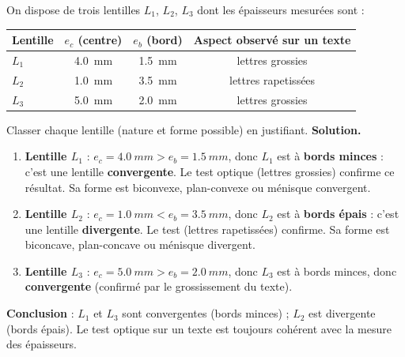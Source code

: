 \documentclass[11pt]{article}
\begin{document}
\begin{exoresolu}
On dispose de trois lentilles $L_1$, $L_2$, $L_3$ dont les épaisseurs mesurées sont :
\begin{center}
\begin{tabular}{|l|c|c|c|}
\hline
\rowcolor{popblueL} Lentille & $e_c$ (centre) & $e_b$ (bord) & Aspect observé sur un texte \\
\hline
$L_1$ & \SI{4,0}{mm} & \SI{1,5}{mm} & lettres grossies \\
\hline
$L_2$ & \SI{1,0}{mm} & \SI{3,5}{mm} & lettres rapetissées \\
\hline
$L_3$ & \SI{5,0}{mm} & \SI{2,0}{mm} & lettres grossies \\
\hline
\end{tabular}
\end{center}
Classer chaque lentille (nature et forme possible) en justifiant.
\tcblower
\textbf{Solution.}
\begin{enumerate}
\item \textbf{Lentille $L_1$} : $e_c = \SI{4,0}{mm} > e_b = \SI{1,5}{mm}$, donc $L_1$ est à \textbf{bords minces} : c'est une lentille \textbf{convergente}. Le test optique (lettres grossies) confirme ce résultat. Sa forme est biconvexe, plan-convexe ou ménisque convergent.
\item \textbf{Lentille $L_2$} : $e_c = \SI{1,0}{mm} < e_b = \SI{3,5}{mm}$, donc $L_2$ est à \textbf{bords épais} : c'est une lentille \textbf{divergente}. Le test (lettres rapetissées) confirme. Sa forme est biconcave, plan-concave ou ménisque divergent.
\item \textbf{Lentille $L_3$} : $e_c = \SI{5,0}{mm} > e_b = \SI{2,0}{mm}$, donc $L_3$ est à bords minces, donc \textbf{convergente} (confirmé par le grossissement du texte).
\end{enumerate}
\textbf{Conclusion} : $L_1$ et $L_3$ sont convergentes (bords minces) ; $L_2$ est divergente (bords épais). Le test optique sur un texte est toujours cohérent avec la mesure des épaisseurs.
\end{exoresolu}
\end{document}
